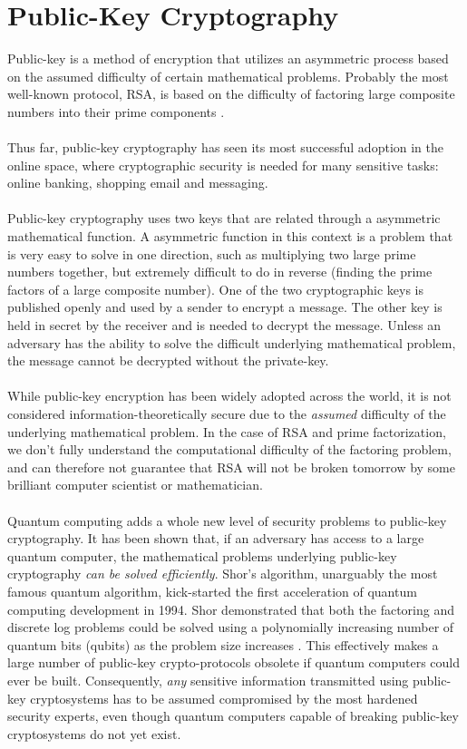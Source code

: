 \documentclass[aps,prl,twocolumn,10pt,nofootinbib]{revtex4}
\begin{document}
\section{Public-Key Cryptography}

Public-key is a method of encryption that utilizes an asymmetric process based on the assumed difficulty of certain mathematical problems.  Probably the most well-known protocol, RSA, is based on the difficulty of factoring large composite numbers into their prime components \cite{?}. 
\\
\\
Thus far, public-key cryptography has seen its most successful adoption in the online space, where cryptographic security is needed for many sensitive tasks: online banking, shopping email and messaging.  
\\
\\
Public-key cryptography uses two keys that are related through a asymmetric mathematical function.  A asymmetric function in this context is a problem that is very easy to solve in one direction, such as multiplying two large prime numbers together, but extremely difficult to do in reverse (finding the prime factors of a large composite number).  One of the two cryptographic keys is published openly and used by a sender to encrypt a message.  The other key is held in secret by the receiver and is needed to decrypt the message.  Unless an adversary has the ability to solve the difficult underlying mathematical problem, the message cannot be decrypted without the private-key.  
\\
\\
While public-key encryption has been widely adopted across the world, it is not considered information-theoretically secure due to the {\em assumed} difficulty of the underlying mathematical problem.  In the case of RSA and prime factorization, we don't fully understand the computational difficulty 
of the factoring problem, and can therefore not guarantee that RSA will not be broken tomorrow by some brilliant computer scientist or mathematician.  
\\
\\
Quantum computing adds a whole new level of security problems to public-key cryptography. It has been shown that, if an adversary has access to a large quantum computer, the mathematical problems underlying public-key cryptography {\em can be solved efficiently}.  Shor's algorithm, unarguably the most famous quantum algorithm, kick-started the first acceleration of quantum computing development in 1994.  Shor demonstrated that both the factoring and discrete log problems could be solved using a polynomially increasing number of quantum bits (qubits) as the problem size increases \cite{?}.  This effectively makes a large number of public-key crypto-protocols obsolete if quantum computers could ever be built.  Consequently, {\em any} sensitive information transmitted using public-key cryptosystems has to be assumed compromised by the most hardened security experts, even though quantum computers capable of breaking public-key cryptosystems do not yet exist. 
\end{document}
